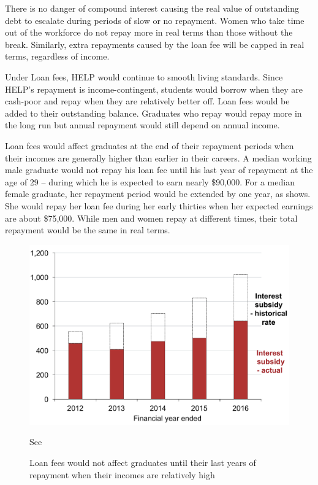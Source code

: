 \documentclass[embargoed]{grattan}
\begin{document}
There is no danger of compound interest causing the real value of outstanding debt to escalate during periods of slow or no repayment.
Women who take time out of the workforce do not repay more in real terms than those without the break.
Similarly, extra repayments caused by the loan fee will be capped in real terms, regardless of income.

Under \gls{Loan fees}, \gls{HELP} would continue to smooth living standards.
Since \gls{HELP}'s repayment is income-contingent, students would borrow when they are cash-poor and repay when they are relatively better off.
\Gls{Loan fees} would be added to their outstanding balance.
Graduates who repay would repay more in the long run but annual repayment would still depend on annual income.

\Gls{Loan fees} would affect graduates at the end of their repayment periods when their incomes are generally higher than earlier in their careers.
A median working male graduate would not repay his loan fee until his last year of repayment at the age of 29 -- during which he is expected to earn nearly \$90,000.
For a median female graduate, her repayment period would be extended by one year, as  shows.
She would repay her loan fee during her early thirties when her expected earnings are about \$75,000.
While men and women repay at different times, their total repayment would be the same in real terms.

\begin{figure}
\caption{\Gls{Loan fees} would not affect graduates until their last years of repayment when their incomes are relatively high}\label{fig:fig21-loan-fees-would-not-affect-grads-until-their-last-years-of-repayment-when-their-incomes-are-relatively-high}


\includegraphics[page=21]{atlas/Chartpack.pdf}

{See }
\end{figure}
\end{document}
